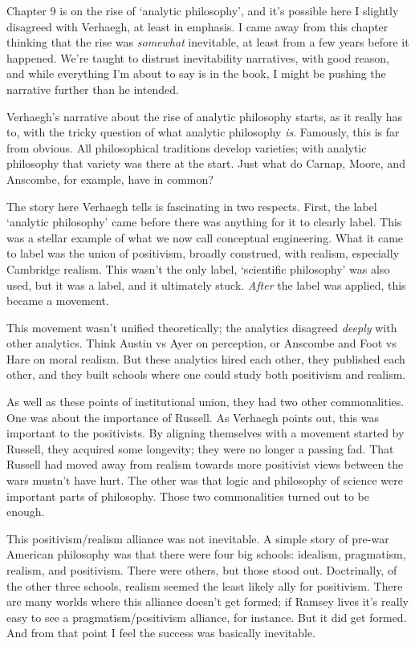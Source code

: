 \documentclass[
  11pt,
  letterpaper,
  DIV=11,
  numbers=noendperiod,
  twoside]{scrartcl}
\begin{document}
Chapter 9 is on the rise of `analytic philosophy', and it's possible
here I slightly disagreed with Verhaegh, at least in emphasis. I came
away from this chapter thinking that the rise was \emph{somewhat}
inevitable, at least from a few years before it happened. We're taught
to distrust inevitability narratives, with good reason, and while
everything I'm about to say is in the book, I might be pushing the
narrative further than he intended.

Verhaegh's narrative about the rise of analytic philosophy starts, as it
really has to, with the tricky question of what analytic philosophy
\emph{is}. Famously, this is far from obvious. All philosophical
traditions develop varieties; with analytic philosophy that variety was
there at the start. Just what do Carnap, Moore, and Anscombe, for
example, have in common?

The story here Verhaegh tells is fascinating in two respects. First, the
label `analytic philosophy' came before there was anything for it to
clearly label. This was a stellar example of what we now call conceptual
engineering. What it came to label was the union of positivism, broadly
construed, with realism, especially Cambridge realism. This wasn't the
only label, `scientific philosophy' was also used, but it was a label,
and it ultimately stuck. \emph{After} the label was applied, this became
a movement.

This movement wasn't unified theoretically; the analytics disagreed
\emph{deeply} with other analytics. Think Austin vs Ayer on perception,
or Anscombe and Foot vs Hare on moral realism. But these analytics hired
each other, they published each other, and they built schools where one
could study both positivism and realism.

As well as these points of institutional union, they had two other
commonalities. One was about the importance of Russell. As Verhaegh
points out, this was important to the positivists. By aligning
themselves with a movement started by Russell, they acquired some
longevity; they were no longer a passing fad. That Russell had moved
away from realism towards more positivist views between the wars mustn't
have hurt. The other was that logic and philosophy of science were
important parts of philosophy. Those two commonalities turned out to be
enough.

This positivism/realism alliance was not inevitable. A simple story of
pre-war American philosophy was that there were four big schools:
idealism, pragmatism, realism, and positivism. There were others, but
those stood out. Doctrinally, of the other three schools, realism seemed
the least likely ally for positivism. There are many worlds where this
alliance doesn't get formed; if Ramsey lives it's really easy to see a
pragmatism/positivism alliance, for instance. But it did get formed. And
from that point I feel the success was basically inevitable.
\end{document}

